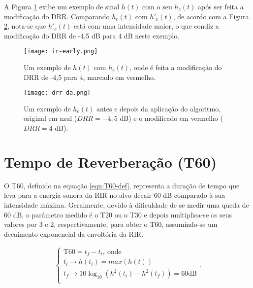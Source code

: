 A Figura \ref{fig:ir-early} exibe um exemplo de sinal $h(t)$ com o seu $h_e(t)$ após ser feita a modificação do DRR.
Comparando $h_e(t)$ com $h'_e(t)$, de acordo com a Figura \ref{fig:drr-da}, nota-se que $h'_e(t)$  está com uma intensidade 
maior, o que condiz a modificação do DRR de -4,5 dB para 4 dB neste exemplo.

\begin{figure}[H]
    \centering
    \texttt{[image: ir-early.png]}
    \caption{Um exemplo de $h(t)$ com $h_e(t)$, onde é feita a modificação do DRR de -4,5 para 4, marcado em vermelho.}
    \label{fig:ir-early}
\end{figure} 

\begin{figure}[H]
    \centering
    \texttt{[image: drr-da.png]}
    \caption{Um exemplo de $h_e(t)$ antes e depois da aplicação do algoritmo, original em azul ($DRR=-4,5$ dB) e o modificado em vermelho ($DRR=4$ dB).}
    \label{fig:drr-da}
\end{figure} 


\section{Tempo de Reverberação (T60)}


O T60, definido na equação \ref{eqn:T60-def}, representa a duração de tempo que leva para a energia sonora da RIR
no alvo decair 60 dB comparado à sua intensidade máxima. Geralmente, devido à dificuldade de se medir uma queda de 60 dB,
o parâmetro medido é o T20 ou o T30 e depois multiplica-se os seus valores por 3 e 2, respectivamente, para obter o T60,
assumindo-se um decaimento exponencial da envoltória da RIR.

\begin{align} \label{eqn:T60-def}
    \begin{cases}
        \text{T60} = t_f-t_i, \ \text{onde}\\
        t_i \rightarrow h(t_i) = max(h(t)) \\
        t_f \rightarrow 10 \log_{10} \left( h^2(t_i) - h^2(t_f) \right) = 60 \text{dB} \\
    \end{cases}
    .
\end{align}

